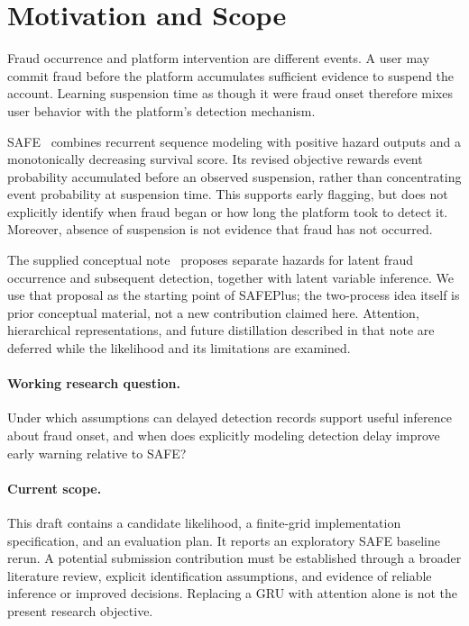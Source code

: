 \section{Motivation and Scope}
Fraud occurrence and platform intervention are different events. A user may
commit fraud before the platform accumulates sufficient evidence to suspend
the account. Learning suspension time as though it were fraud onset therefore
mixes user behavior with the platform's detection mechanism.

SAFE~\cite{zheng2019safe} combines recurrent sequence modeling with positive
hazard outputs and a monotonically decreasing survival score. Its revised
objective rewards event probability accumulated before an observed suspension,
rather than concentrating event probability at suspension time. This supports
early flagging, but does not explicitly identify when fraud began or how long
the platform took to detect it. Moreover, absence of suspension is not evidence
that fraud has not occurred.

The supplied conceptual note~\cite{smola2022note} proposes separate hazards
for latent fraud occurrence and subsequent detection, together with latent
variable inference. We use that proposal as the starting point of SAFEPlus;
the two-process idea itself is prior conceptual material, not a new
contribution claimed here. Attention, hierarchical representations, and future
distillation described in that note are deferred while the likelihood and its
limitations are examined.

\paragraph{Working research question.}
Under which assumptions can delayed detection records support useful
inference about fraud onset, and when does explicitly modeling detection
delay improve early warning relative to SAFE?

\paragraph{Current scope.}
This draft contains a candidate likelihood, a finite-grid implementation
specification, and an evaluation plan. It reports an exploratory SAFE baseline rerun. A potential
submission contribution must be established through a broader literature
review, explicit identification assumptions, and evidence of reliable
inference or improved decisions. Replacing a GRU with attention alone is not
the present research objective.
